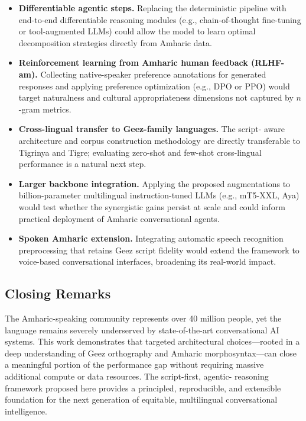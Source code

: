 \begin{itemize}
  \item \textbf{Differentiable agentic steps.}  Replacing the deterministic pipeline with
        end-to-end differentiable reasoning modules (e.g., chain-of-thought fine-tuning or
        tool-augmented LLMs) could allow the model to learn optimal decomposition strategies
        directly from Amharic data.

  \item \textbf{Reinforcement learning from Amharic human feedback (RLHF-am).}  Collecting
        native-speaker preference annotations for generated responses and applying preference
        optimization (e.g., DPO or PPO) would target naturalness and cultural appropriateness
        dimensions not captured by $n$-gram metrics.

  \item \textbf{Cross-lingual transfer to Ge\textquotesingle ez-family languages.}  The script-%
        aware architecture and corpus construction methodology are directly transferable to
        Tigrinya and Tigre; evaluating zero-shot and few-shot cross-lingual performance is a
        natural next step.

  \item \textbf{Larger backbone integration.}  Applying the proposed augmentations to
        billion-parameter multilingual instruction-tuned LLMs (e.g., mT5-XXL, Aya) would
        test whether the synergistic gains persist at scale and could inform practical
        deployment of Amharic conversational agents.

  \item \textbf{Spoken Amharic extension.}  Integrating automatic speech recognition
        preprocessing that retains Ge\textquotesingle ez script fidelity would extend the
        framework to voice-based conversational interfaces, broadening its real-world impact.
\end{itemize}

\subsection*{Closing Remarks}

The Amharic-speaking community represents over 40 million people, yet the language remains
severely underserved by state-of-the-art conversational AI systems.  This work demonstrates
that targeted architectural choices---rooted in a deep understanding of Ge\textquotesingle ez
orthography and Amharic morphosyntax---can close a meaningful portion of the performance gap
without requiring massive additional compute or data resources.  The script-first, agentic-%
reasoning framework proposed here provides a principled, reproducible, and extensible
foundation for the next generation of equitable, multilingual conversational intelligence.
